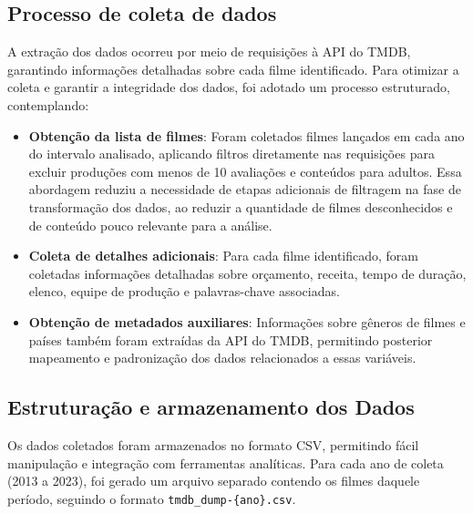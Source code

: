 \subsection{Processo de coleta de dados}
A extração dos dados ocorreu por meio de requisições à \acrshort{API} do \acrshort{TMDB}, garantindo informações detalhadas sobre cada filme identificado. Para otimizar a coleta e garantir a integridade dos dados, foi adotado um processo estruturado, contemplando:

\begin{itemize}
    \item \textbf{Obtenção da lista de filmes}: Foram coletados filmes lançados em cada ano do intervalo analisado, aplicando filtros diretamente nas requisições para excluir produções com menos de 10 avaliações e conteúdos para adultos. Essa abordagem reduziu a necessidade de etapas adicionais de filtragem na fase de transformação dos dados, ao reduzir a quantidade de filmes desconhecidos e de conteúdo pouco relevante para a análise.
    \item \textbf{Coleta de detalhes adicionais}: Para cada filme identificado, foram coletadas informações detalhadas sobre orçamento, receita, tempo de duração, elenco, equipe de produção e palavras-chave associadas.
    \item \textbf{Obtenção de metadados auxiliares}: Informações sobre gêneros de filmes e países também foram extraídas da \acrshort{API} do \acrshort{TMDB}, permitindo posterior mapeamento e padronização dos dados relacionados a essas variáveis.
\end{itemize}

\subsection{Estruturação e armazenamento dos Dados}
Os dados coletados foram armazenados no formato CSV, permitindo fácil manipulação e integração com ferramentas analíticas. Para cada ano de coleta (2013 a 2023), foi gerado um arquivo separado contendo os filmes daquele período, seguindo o formato \texttt{tmdb\_dump-\{ano\}.csv}.

